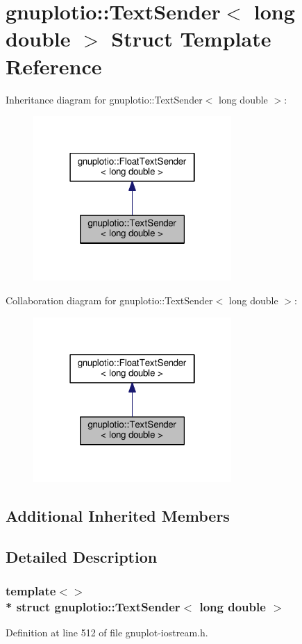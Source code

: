 \hypertarget{structgnuplotio_1_1_text_sender_3_01long_01double_01_4}{}\section{gnuplotio\+:\+:Text\+Sender$<$ long double $>$ Struct Template Reference}
\label{structgnuplotio_1_1_text_sender_3_01long_01double_01_4}


Inheritance diagram for gnuplotio\+:\+:Text\+Sender$<$ long double $>$\+:
\nopagebreak
\begin{figure}[H]
\begin{center}
\leavevmode
\includegraphics[width=214pt]{structgnuplotio_1_1_text_sender_3_01long_01double_01_4__inherit__graph}
\end{center}
\end{figure}


Collaboration diagram for gnuplotio\+:\+:Text\+Sender$<$ long double $>$\+:
\nopagebreak
\begin{figure}[H]
\begin{center}
\leavevmode
\includegraphics[width=214pt]{structgnuplotio_1_1_text_sender_3_01long_01double_01_4__coll__graph}
\end{center}
\end{figure}
\subsection*{Additional Inherited Members}


\subsection{Detailed Description}
\subsubsection*{template$<$$>$\\*
struct gnuplotio\+::\+Text\+Sender$<$ long double $>$}



Definition at line 512 of file gnuplot-\/iostream.\+h.

